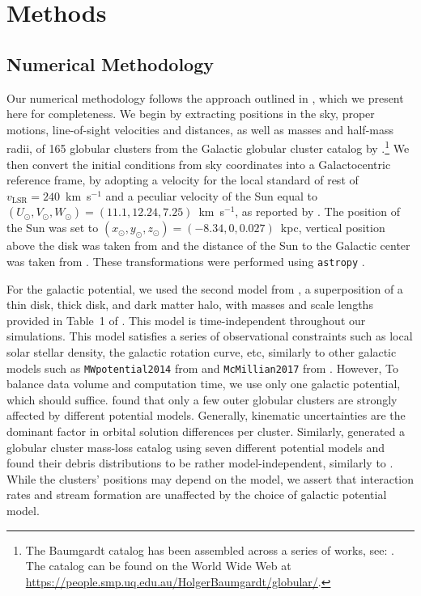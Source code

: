 \documentclass{aa}
\begin{document}
\section{Methods}

  \subsection{Numerical Methodology}
    Our numerical methodology follows the approach outlined in \citet{2023A&A...673A..44F}, which we present here for completeness. We begin by extracting positions in the sky, proper motions, line-of-sight velocities and distances, as well as masses and half-mass radii, of 165 globular clusters from the Galactic globular cluster catalog by \cite{2021MNRAS.505.5957B}.\footnote{The Baumgardt catalog has been assembled across a series of works, see: \cite{2020PASA...37...46B,2019MNRAS.482.5138B,2018MNRAS.478.1520B}. The catalog can be found on the World Wide Web at \href{https://people.smp.uq.edu.au/HolgerBaumgardt/globular/}{https://people.smp.uq.edu.au/HolgerBaumgardt/globular/}.} We then convert the initial conditions from sky coordinates into a Galactocentric reference frame, by adopting a velocity for the local standard of rest of $v_{\text{LSR}} = 240$~km~s$^{-1}$ and a peculiar velocity of the Sun equal to $(U_\odot, V_\odot, W_\odot)=(11.1, 12.24, 7.25)$~km~s$^{-1}$, as reported by \citet{2012MNRAS.427..274S}.  The position of the Sun was set to $(x_\odot,y_\odot,z_\odot) = (-8.34,0,0.027)$~kpc, vertical position above the disk was taken from \citet{2001ApJ...553..184C} and the distance of the Sun to the Galactic center was taken from \citet{2014ApJ...783..130R}. These transformations were performed using \texttt{astropy} \citep{2013A&A...558A..33A}.

    For the galactic potential, we used the second model from \citet{2017A&A...598A..66P}, a superposition of a thin disk, thick disk, and dark matter halo, with masses and scale lengths provided in Table~1 of \citet{2023A&A...673A..44F}. This model is time-independent throughout our simulations. This model satisfies a series of observational constraints such as local solar stellar density, the galactic rotation curve, etc, similarly to other galactic models such as \texttt{MWpotential2014} from \citet{2015ApJS..216...29B} and \texttt{McMillian2017} from \citet{2017MNRAS.465...76M}. However, To balance data volume and computation time, we use only one galactic potential, which should suffice. \citet{2021MNRAS.505.5978V} found that only a few outer globular clusters are strongly affected by different potential models. Generally, kinematic uncertainties are the dominant factor in orbital solution differences per cluster. Similarly, \citet{2024MNRAS.528.5189G} generated a globular cluster mass-loss catalog using seven different potential models and found their debris distributions to be rather model-independent, similarly to \citet{2023A&A...673A..44F}. While the clusters' positions may depend on the model, we assert that interaction rates and stream formation are unaffected by the choice of galactic potential model.  
    
\end{document}
